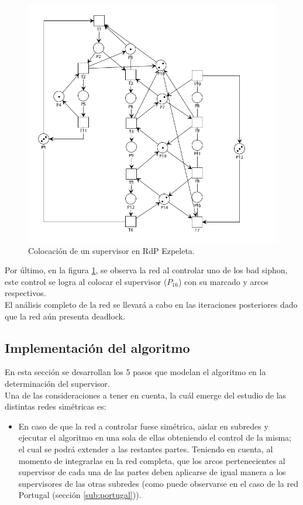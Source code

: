 \begin{figure}[H]
    \centering
    \includegraphics[scale=0.7]{Figures/algoritmo3/desarrollo/ezpeleta4.png}
    \caption{Colocación de un supervisor en RdP Ezpeleta.}
    \label{fig:fig3.8}
 \end{figure}

Por último, en la figura \ref{fig:fig3.8}, se observa la red al controlar uno de los bad siphon, este control se logra al colocar el supervisor ($P_{16}$) con su marcado y arcos respectivos. \\


\noindent El análisis completo de la red se llevará a cabo en las iteraciones posteriores dado que la red aún presenta deadlock.


\subsection{Implementación del algoritmo}
En esta sección se desarrollan los 5 pasos que modelan el algoritmo en la determinación del supervisor. \\
Una de las consideraciones a tener en cuenta, la cuál emerge del estudio de las distintas redes simétricas es:
\begin{itemize}
    \item En caso de que la red a controlar fuese simétrica, aislar en subredes y ejecutar el algoritmo en una sola de ellas obteniendo el control de la misma; el cual se podrá extender a las restantes partes. Teniendo en cuenta, al momento de integrarlas en la red completa, que los arcos pertenecientes al supervisor de cada una de las partes deben aplicarse de igual manera a los supervisores de las otras subredes (como puede observarse en el caso de la red Portugal (sección \ref{sub:portugal})). %
\end{itemize}

